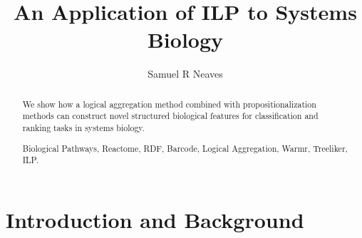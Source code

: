 \documentclass[runningheads,a4paper]{llncs}
\newcommand{\keywords}[1]{\par\addvspace\baselineskip
\noindent\keywordname\enspace\ignorespaces#1}
\begin{document}
\mainmatter  %


\title{An Application of ILP to Systems Biology}

%
%
\author{Samuel R Neaves}
%


%
%

\maketitle


\begin{abstract}
We show how a logical aggregation method combined 
with propositionalization methods can construct novel structured biological features for 	classification and ranking tasks in systems biology. 

\keywords{Biological Pathways, Reactome, RDF, Barcode, Logical Aggregation, Warmr, Treeliker, ILP.}
\end{abstract}


\section{Introduction and Background}
\end{document}

